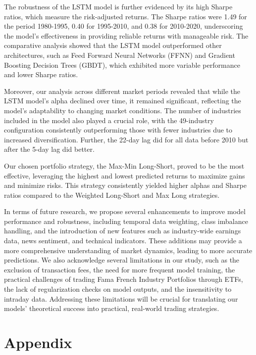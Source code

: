 \documentclass{article}
\begin{document}
The robustness of the LSTM model is further evidenced by its high Sharpe ratios, which measure the risk-adjusted returns. The Sharpe ratios were 1.49 for the period 1980-1995, 0.40 for 1995-2010, and 0.38 for 2010-2020, underscoring the model's effectiveness in providing reliable returns with manageable risk. The comparative analysis showed that the LSTM model outperformed other architectures, such as Feed Forward Neural Networks (FFNN) and Gradient Boosting Decision Trees (GBDT), which exhibited more variable performance and lower Sharpe ratios.

Moreover, our analysis across different market periods revealed that while the LSTM model's alpha declined over time, it remained significant, reflecting the model's adaptability to changing market conditions. The number of industries included in the model also played a crucial role, with the 49-industry configuration consistently outperforming those with fewer industries due to increased diversification. Further, the 22-day lag did for all data before 2010 but after the 5-day lag did better.

Our chosen portfolio strategy, the Max-Min Long-Short, proved to be the most effective, leveraging the highest and lowest predicted returns to maximize gains and minimize risks. This strategy consistently yielded higher alphas and Sharpe ratios compared to the Weighted Long-Short and Max Long strategies.
 
In terms of future research, we propose several enhancements to improve model performance and robustness, including temporal data weighting, class imbalance handling, and the introduction of new features such as industry-wide earnings data, news sentiment, and technical indicators. These additions may provide a more comprehensive understanding of market dynamics, leading to more accurate predictions. We also acknowledge several limitations in our study, such as the exclusion of transaction fees, the need for more frequent model training, the practical challenges of trading Fama French Industry Portfolios through ETFs, the lack of regularization checks on model outputs, and the insensitivity to intraday data. Addressing these limitations will be crucial for translating our models' theoretical success into practical, real-world trading strategies.

\medskip




\section{Appendix}
\end{document}
